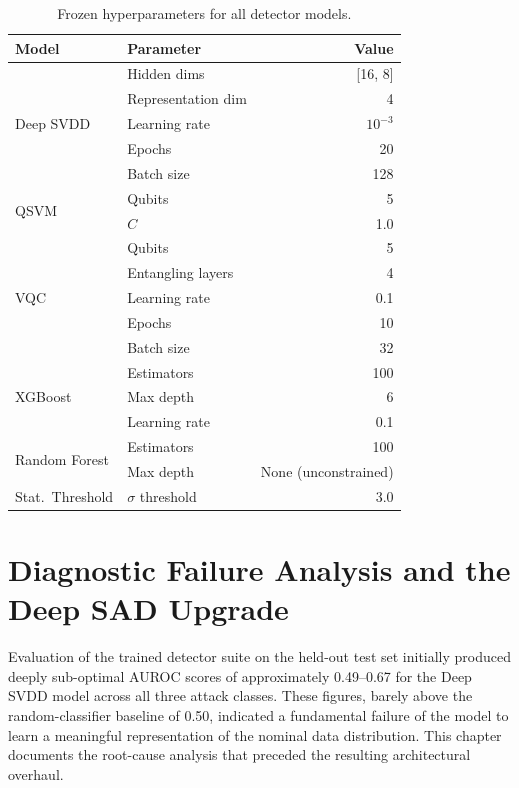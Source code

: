 \documentclass[12pt, a4paper]{report}
\begin{document}
\begin{table}[h]
\centering
\caption{Frozen hyperparameters for all detector models.}
\label{tab:hyperparams}
\begin{tabular}{@{}llr@{}}
\toprule
\textbf{Model} & \textbf{Parameter} & \textbf{Value} \\
\midrule
\multirow{5}{*}{Deep SVDD}
    & Hidden dims         & [16, 8] \\
    & Representation dim  & 4 \\
    & Learning rate       & $10^{-3}$ \\
    & Epochs              & 20 \\
    & Batch size          & 128 \\
\midrule
\multirow{2}{*}{QSVM}
    & Qubits              & 5 \\
    & $C$                 & 1.0 \\
\midrule
\multirow{5}{*}{VQC}
    & Qubits              & 5 \\
    & Entangling layers   & 4 \\
    & Learning rate       & 0.1 \\
    & Epochs              & 10 \\
    & Batch size          & 32 \\
\midrule
\multirow{3}{*}{XGBoost}
    & Estimators          & 100 \\
    & Max depth           & 6 \\
    & Learning rate       & 0.1 \\
\midrule
\multirow{2}{*}{Random Forest}
    & Estimators          & 100 \\
    & Max depth           & None (unconstrained) \\
\midrule
Stat.\ Threshold & $\sigma$ threshold & 3.0 \\
\bottomrule
\end{tabular}
\end{table}

\chapter{Diagnostic Failure Analysis and the Deep SAD Upgrade}\label{ch:diagnosis}

Evaluation of the trained detector suite on the held-out test set initially produced deeply sub-optimal AUROC scores of approximately 0.49--0.67 for the Deep SVDD model across all three attack classes. These figures, barely above the random-classifier baseline of 0.50, indicated a fundamental failure of the model to learn a meaningful representation of the nominal data distribution. This chapter documents the root-cause analysis that preceded the resulting architectural overhaul.
\end{document}
